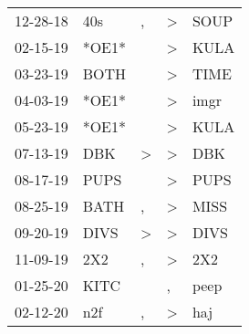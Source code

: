 \begin{supertabular}{p{0.07\textwidth}p{0.06\textwidth}p{0.02\textwidth}p{0.02\textwidth}p{0.06\textwidth}}
          12-28-18\textsuperscript{} &            40s\textsuperscript{} &                , &     \textgreater &           SOUP\textsuperscript{} \\
          02-15-19\textsuperscript{} &                            *OE1* &                  &     \textgreater &           KULA\textsuperscript{} \\
          03-23-19\textsuperscript{} &           BOTH\textsuperscript{} &                  &     \textgreater &           TIME\textsuperscript{} \\
          04-03-19\textsuperscript{} &                            *OE1* &                  &     \textgreater &           imgr\textsuperscript{} \\
          05-23-19\textsuperscript{} &                            *OE1* &                  &     \textgreater &           KULA\textsuperscript{} \\
          07-13-19\textsuperscript{} &            DBK\textsuperscript{} &     \textgreater &     \textgreater &            DBK\textsuperscript{} \\
          08-17-19\textsuperscript{} &           PUPS\textsuperscript{} &                  &     \textgreater &           PUPS\textsuperscript{} \\
          08-25-19\textsuperscript{} &           BATH\textsuperscript{} &                , &     \textgreater &           MISS\textsuperscript{} \\
          09-20-19\textsuperscript{} &           DIVS\textsuperscript{} &     \textgreater &     \textgreater &           DIVS\textsuperscript{} \\
          11-09-19\textsuperscript{} &            2X2\textsuperscript{} &                , &     \textgreater &            2X2\textsuperscript{} \\
          01-25-20\textsuperscript{} &           KITC\textsuperscript{} &                  &                , &           peep\textsuperscript{} \\
          02-12-20\textsuperscript{} &            n2f\textsuperscript{} &                , &     \textgreater &            haj\textsuperscript{} \\
\end{supertabular}
